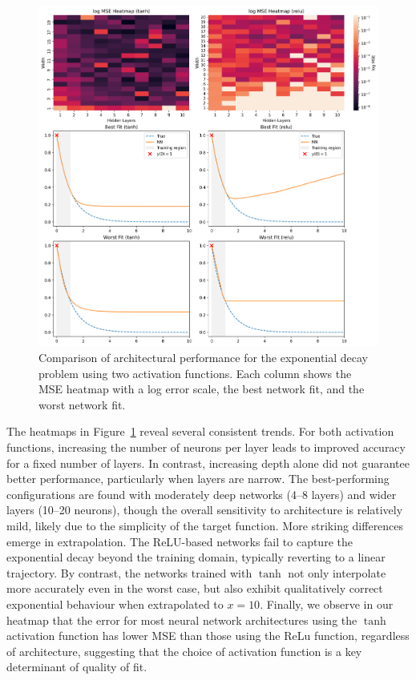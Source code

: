 \begin{figure}[htbp]
    \centering
    \includegraphics[width=\textwidth]{graphics/ivp_exponential_combined.png}
    \caption{Comparison of architectural performance for the exponential decay problem using two 
    activation functions. Each column shows the MSE heatmap with a log error scale,
    the best network fit, and the worst network fit.}
    \label{fig:expdecay_sidebyside}
\end{figure}


The heatmaps in Figure~\ref{fig:expdecay_sidebyside} reveal several consistent trends. For 
both activation functions, increasing the number of neurons per layer leads to improved 
accuracy for a fixed number of layers. In contrast, increasing depth alone did not guarantee better 
performance, particularly when layers are narrow. The best-performing configurations are found with 
moderately deep networks (4--8 layers) and wider layers (10--20 neurons), though the overall 
sensitivity to architecture is relatively mild, likely due to the simplicity of the target 
function. More striking differences emerge in extrapolation. The ReLU-based networks fail to 
capture the exponential decay beyond the training domain, typically reverting to a linear 
trajectory. By contrast, the networks trained with \(\tanh\) not only interpolate more accurately 
even in the worst case, but also exhibit qualitatively correct exponential behaviour when extrapolated 
to \(x = 10\). Finally, we observe in our heatmap that the error for most neural network architectures 
using the $\tanh$ activation function has lower MSE than those using the ReLu function, regardless 
of architecture, suggesting that the choice of activation function is a key determinant of quality of 
fit.



